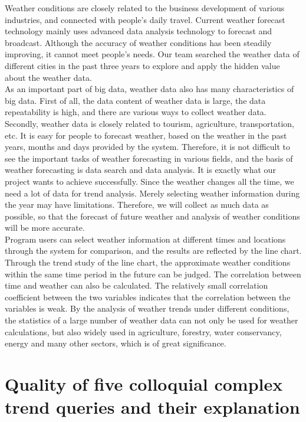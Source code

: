 \documentclass[]{article}
\begin{document}
	Weather conditions are closely related to the business development of various industries, and connected with people's daily travel. Current weather forecast technology mainly uses advanced data analysis technology to forecast and broadcast. Although the accuracy of weather conditions has been steadily improving, it cannot meet people's needs. Our team searched the weather data of different cities in the past three years to explore and apply the hidden value about the weather data. \\
	
	\noindent As an important part of big data, weather data also has many characteristics of big data. First of all, the data content of weather data is large, the data repeatability is high, and there are various ways to collect weather data. Secondly, weather data is closely related to tourism, agriculture, transportation, etc. It is easy for people to forecast weather, based on the weather in the past years, months and days provided by the system. Therefore, it is not difficult to see the important tasks of weather forecasting in various fields, and the basis of weather forecasting is data search and data analysis. It is exactly what our project wants to achieve successfully. Since the weather changes all the time, we need a lot of data for trend analysis. Merely selecting weather information during the year may have limitations. Therefore, we will collect as much data as possible, so that the forecast of future weather and analysis of weather conditions will be more accurate. \\
	
	\noindent Program users can select weather information at different times and locations through the system for comparison, and the results are reflected by the line chart. Through the trend study of the line chart, the approximate weather conditions within the same time period in the future can be judged. The correlation between time and weather can also be calculated. The relatively small correlation coefficient between the two variables indicates that the correlation between the variables is weak. By the analysis of weather trends under different conditions, the statistics of a large number of weather data can not only be used for weather calculations, but also widely used in agriculture, forestry, water conservancy, energy and many other sectors, which is of great significance.
	
\section{Quality of five colloquial complex trend queries and their explanation}
\end{document}

